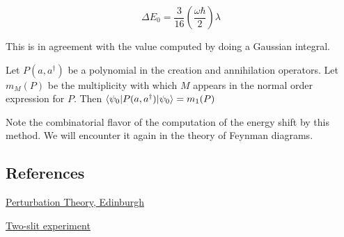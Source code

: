 \begin{equation}
\Delta E_0 = \frac{3}{16}\left( \frac{\omega \hbar}{2}\right)  \lambda
\end{equation}

This is in agreement with the value computed by doing a Gaussian integral.

\begin{remark}
Let $P(a,a^\dagger)$ be a polynomial in the creation and annihilation operators.  Let $m_M(P)$ be the multiplicity with which $M$ appears in the normal order expression for $P$. Then $\langle \psi_0 | P(a,a^\dagger) | \psi_0 \rangle = m_1(P)$
\end{remark}

Note the combinatorial flavor of the computation of the energy shift by this method.  We will encounter it again in the theory of Feynman diagrams.

\subsection{References}

\href{http://www2.ph.ed.ac.uk/~ldeldebb/docs/QM/lect17.pdf}{Perturbation Theory, Edinburgh}

\href{http://www.cavendishscience.org/phys/tyoung/tyoung.htm}{Two-slit experiment}
